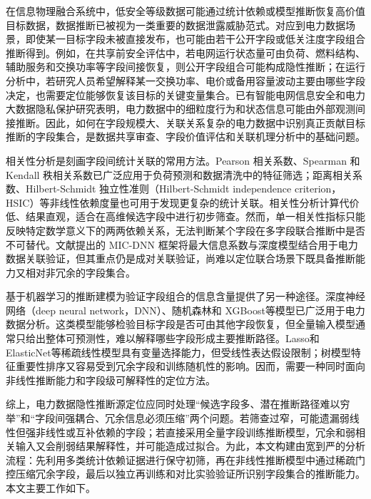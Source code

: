 \documentclass[UTF8,zihao=5,twoside]{ctexart}
\numberwithin{equation}{section}
\begin{document}
在信息物理融合系统中，低安全等级数据可能通过统计依赖或模型推断恢复高价值目标数据，数据推断已被视为一类重要的数据泄露威胁范式\cite{ref-liu-data-inference}。对应到电力数据场景，即使某一目标字段未被直接发布，也可能由若干公开字段或低关注度字段组合推断得到。例如，在共享前安全评估中，若电网运行状态量可由负荷、燃料结构、辅助服务和交换功率等字段间接恢复，则公开字段组合可能构成隐性推断；在运行分析中，若研究人员希望解释某一交换功率、电价或备用容量波动主要由哪些字段决定，也需要定位能够恢复该目标的关键变量集合。已有智能电网信息安全和电力大数据隐私保护研究表明，电力数据中的细粒度行为和状态信息可能由外部观测间接推断\cite{ref-sankar,ref-giaconi,ref-adewole,ref-zhang-sgcc,ref-chen-privacy}。因此，如何在字段规模大、关联关系复杂的电力数据中识别真正贡献目标推断的字段集合，是数据共享审查、字段价值评估和关联机理分析中的基础问题。

相关性分析是刻画字段间统计关联的常用方法。Pearson 相关系数、Spearman 和 Kendall 秩相关系数已广泛应用于负荷预测和数据清洗中的特征筛选\cite{ref-lan-load,ref-jiao-pv,ref-deng-load}；距离相关系数\cite{ref-szekely-dcorr}、Hilbert-Schmidt 独立性准则（Hilbert-Schmidt independence criterion，HSIC）等非线性依赖度量也可用于发现更复杂的统计关联。相关性分析计算代价低、结果直观，适合在高维候选字段中进行初步筛查。然而，单一相关性指标只能反映特定数学意义下的两两依赖关系，无法判断某个字段在多字段联合推断中是否不可替代。文献\cite{ref-reshef-mic,ref-xing-micdnn}提出的 MIC-DNN 框架将最大信息系数与深度模型结合用于电力数据关联验证，但其重点仍是成对关联验证，尚难以定位联合场景下既具备推断能力又相对非冗余的字段集合。

基于机器学习的推断建模为验证字段组合的信息含量提供了另一种途径。深度神经网络（deep neural network，DNN）\cite{ref-lecun-deep,ref-goodfellow-deep}、随机森林\cite{ref-breiman-rf}和 XGBoost\cite{ref-chen-xgboost}等模型已广泛用于电力数据分析\cite{ref-wang-meter}。这类模型能够检验目标字段是否可由其他字段恢复，但全量输入模型通常只给出整体可预测性，难以解释哪些字段形成主要推断路径。Lasso\cite{ref-tibshirani-lasso}和 ElasticNet\cite{ref-zou-enet}等稀疏线性模型具有变量选择能力，但受线性表达假设限制；树模型特征重要性排序又容易受到冗余字段和训练随机性的影响。因而，需要一种同时面向非线性推断能力和字段级可解释性的定位方法。

综上，电力数据隐性推断源定位应同时处理“候选字段多、潜在推断路径难以穷举”和“字段间强耦合、冗余信息必须压缩”两个问题。若筛查过窄，可能遗漏弱线性但强非线性或互补依赖的字段；若直接采用全量字段训练推断模型，冗余和弱相关输入又会削弱结果解释性，并可能造成过拟合。为此，本文构建由宽到严的分析流程：先利用多类统计依赖证据进行保守初筛，再在非线性推断模型中通过稀疏门控压缩冗余字段，最后以独立再训练和对比实验验证所识别字段集合的推断能力。本文主要工作如下。
\end{document}
